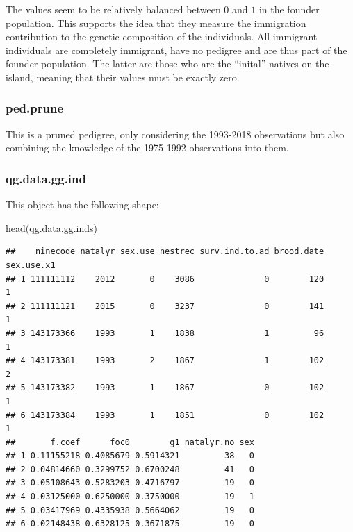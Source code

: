 \documentclass[
]{article}
\newenvironment{Shaded}{\begin{snugshade}}{\end{snugshade}}
\newcommand{\FunctionTok}[1]{\textcolor[rgb]{0.00,0.00,0.00}{#1}}
\newcommand{\NormalTok}[1]{#1}
\begin{document}
The values seem to be relatively balanced between \(0\) and \(1\) in the
founder population. This supports the idea that they measure the
immigration contribution to the genetic composition of the individuals.
All immigrant individuals are completely immigrant, have no pedigree and
are thus part of the founder population. The latter are those who are
the ``inital'' natives on the island, meaning that their values must be
exactly zero.

\hypertarget{ped.prune}{%
\subsubsection*{ped.prune}\label{ped.prune}}

This is a pruned pedigree, only considering the 1993-2018 observations
but also combining the knowledge of the 1975-1992 observations into
them.

\hypertarget{qg.data.gg.ind}{%
\subsubsection*{qg.data.gg.ind}\label{qg.data.gg.ind}}

This object has the following shape:

\begin{Shaded}
\begin{Highlighting}[]
\FunctionTok{head}\NormalTok{(qg.data.gg.inds)}
\end{Highlighting}
\end{Shaded}

\begin{verbatim}
##    ninecode natalyr sex.use nestrec surv.ind.to.ad brood.date sex.use.x1
## 1 111111112    2012       0    3086              0        120          1
## 2 111111121    2015       0    3237              0        141          1
## 3 143173366    1993       1    1838              1         96          1
## 4 143173381    1993       2    1867              1        102          2
## 5 143173382    1993       1    1867              0        102          1
## 6 143173384    1993       1    1851              0        102          1
##       f.coef      foc0        g1 natalyr.no sex
## 1 0.11155218 0.4085679 0.5914321         38   0
## 2 0.04814660 0.3299752 0.6700248         41   0
## 3 0.05108643 0.5283203 0.4716797         19   0
## 4 0.03125000 0.6250000 0.3750000         19   1
## 5 0.03417969 0.4335938 0.5664062         19   0
## 6 0.02148438 0.6328125 0.3671875         19   0
\end{verbatim}
\end{document}
